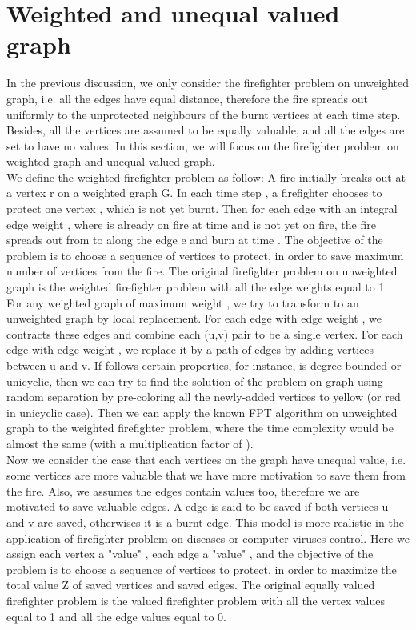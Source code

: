 \documentclass[11pt,letter]{article}
\begin{document}
\section{Weighted and unequal valued graph}
In the previous discussion, we only consider the firefighter problem on unweighted graph, i.e. all the edges have equal distance, therefore the fire spreads out uniformly to the unprotected neighbours of the burnt vertices at each time step. Besides, all the vertices are assumed to be equally valuable, and all the edges are set to have no values. In this section, we will focus on the firefighter problem on weighted graph and unequal valued graph.\\

We define the weighted firefighter problem as follow: A fire initially breaks out at a vertex r on a weighted graph G. In each time step , a firefighter chooses to protect one vertex , which is not yet burnt. Then for each edge  with an integral edge weight , where  is already on fire at time  and  is not yet on fire, the fire spreads out from  to  along the edge e and burn  at time . The objective of the problem is to choose a sequence of vertices  to protect, in order to save maximum number of vertices from the fire. The original firefighter problem on unweighted graph is the weighted firefighter problem with all the edge weights equal to 1.\\

For any weighted graph  of maximum weight , we try to transform  to an unweighted graph  by local replacement. For each edge  with edge weight , we contracts these edges and combine each (u,v) pair to be a single vertex. For each edge  with edge weight , we replace it by a path  of  edges by adding  vertices between u and v. If  follows certain properties, for instance,  is degree bounded or unicyclic, then we can try to find the solution of the problem on graph  using random separation by pre-coloring all the newly-added vertices to yellow (or red in unicyclic case). Then we can apply the known FPT algorithm on unweighted graph to the weighted firefighter problem, where the time complexity would be almost the same (with a multiplication factor of ).\\

Now we consider the case that each vertices on the graph  have unequal value, i.e. some vertices are more valuable that we have more motivation to save them from the fire. Also, we assumes the edges contain values too, therefore we are motivated to save valuable edges. A edge  is said to be saved if both vertices u and v are saved, otherwises it is a burnt edge. This model is more realistic in the application of firefighter problem on diseases or computer-viruses control. Here we assign each vertex  a "value" , each edge  a "value" , and the objective of the  problem is to choose a sequence of vertices  to protect, in order to maximize the total value Z of saved vertices and saved edges. The original equally valued firefighter problem is the valued firefighter problem with all the vertex values equal to 1 and all the edge values equal to 0. \\
\end{document}
